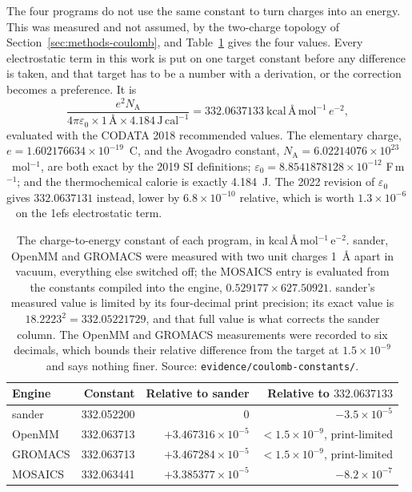The four programs do not use the same constant to turn charges into an energy.
This was measured and not assumed, by the two-charge topology of
Section~\ref{sec:methods-coulomb}, and Table~\ref{tab:coulomb} gives the four
values. Every electrostatic term in this work is put on one target constant
before any difference is taken, and that target has to be a number with a
derivation, or the correction becomes a preference. It is
\begin{equation*}
  \frac{e^2 N_{\mathrm A}}{4\pi\varepsilon_0 \times 1\,\text{\AA} \times
  4.184\,\mathrm{J\,cal^{-1}}}
  = 332.0637133\ \mathrm{kcal}\,\text{\AA}\,\mathrm{mol}^{-1}\,e^{-2},
\end{equation*}
evaluated with the CODATA 2018 recommended values\cite{codata2018}. The
elementary charge, $e = 1.602176634\times10^{-19}$~C, and the Avogadro
constant, $N_{\mathrm A} = 6.02214076\times10^{23}$~mol$^{-1}$, are both exact
by the 2019 SI definitions; $\varepsilon_0 = 8.8541878128\times10^{-12}$
F\,m$^{-1}$; and the thermochemical calorie is exactly 4.184~J. The 2022 revision of $\varepsilon_0$ gives $332.0637131$
instead, lower by $6.8\times10^{-10}$ relative, which is worth
$1.3\times10^{-6}$~\kcal{} on the 1efs electrostatic term.

\begin{table}[t]
\centering
\small
\caption{The charge-to-energy constant of each program, in
kcal\,\AA\,mol$^{-1}$\,e$^{-2}$. sander, OpenMM and GROMACS were measured with
two unit charges 1~\AA{} apart in vacuum, everything else switched off; the
MOSAICS entry is evaluated from the constants compiled into the engine,
$0.529177 \times 627.50921$. sander's measured value is limited by its
four-decimal print precision; its exact value is $18.2223^2 = 332.05221729$,
and that full value is what corrects the sander column. The OpenMM and GROMACS
measurements were recorded to six decimals, which bounds their relative
difference from the target at $1.5\times10^{-9}$ and says nothing finer.
Source: \texttt{evidence/coulomb-constants/}.}
\label{tab:coulomb}
\begin{tabular}{@{}lrrr@{}}
\toprule
Engine & Constant & Relative to sander & Relative to $332.0637133$ \\
\midrule
sander  & 332.052200 & $0$                   & $-3.5\times10^{-5}$ \\
OpenMM  & 332.063713 & $+3.467316\times10^{-5}$ & $<1.5\times10^{-9}$, print-limited \\
GROMACS & 332.063713 & $+3.467284\times10^{-5}$ & $<1.5\times10^{-9}$, print-limited \\
MOSAICS & 332.063441 & $+3.385377\times10^{-5}$ & $-8.2\times10^{-7}$ \\
\bottomrule
\end{tabular}
\end{table}

